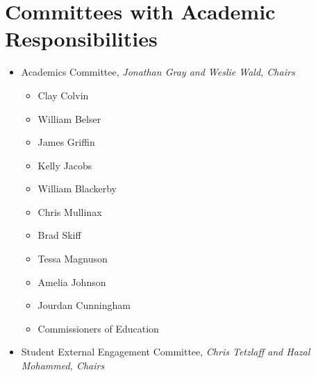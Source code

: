 \section{Committees with Academic Responsibilities}
\begin{itemize}\itemsep=0mm
  \item[] Academics Committee, \emph{Jonathan Gray and Weslie Wald, Chairs}
\begin{itemize}\itemsep=0mm
  \item[] Clay Colvin
  \item[] William Belser
  \item[] James Griffin
  \item[] Kelly Jacobs
  \item[] William Blackerby
  \item[] Chris Mullinax 
  \item[] Brad Skiff 
  \item[] Tessa Magnuson    
  \item[] Amelia Johnson             
  \item[] Jourdan Cunningham
    \item[] Commissioners of Education
\end{itemize}\etc
  \item[] Student External Engagement Committee, \emph{Chris Tetzlaff and Hazal Mohammed, Chairs}
\end{itemize}






